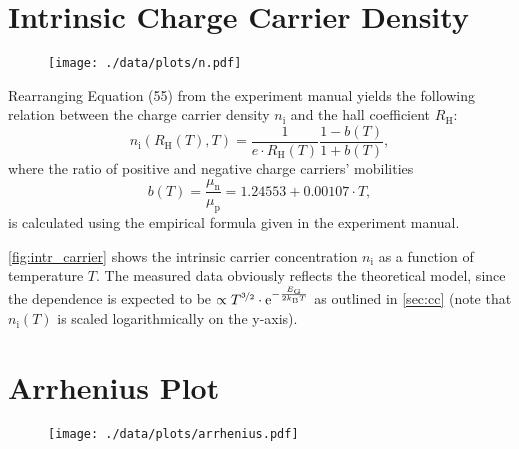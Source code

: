 \section{Intrinsic Charge Carrier Density}
\begin{figure}
	\centering
	\texttt{[image: ./data/plots/n.pdf]}
	\label{fig:intr_carrier}
\end{figure}

Rearranging Equation (55) from the experiment manual yields the following relation between the charge carrier density $n_\text{i}$ and the hall coefficient $R_\text{H}$:
\begin{equation*}
	n_\text{i} \left(R_\text{H}\left( T \right), T \right) = \frac{1}{e \cdot R_\text{H}\left(T\right)} \frac{ 1 - b \left( T \right) }{ 1 + b \left( T \right) },
\end{equation*}
where the ratio of positive and negative charge carriers' mobilities
\begin{equation*}
	b \left( T \right) = \frac{\mu_\text{n}}{\mu_\text{p}} = \num{1.24553} + \num{0.00107} \cdot T,
\end{equation*}
is calculated using the empirical formula given in the experiment manual.

\autoref{fig:intr_carrier} shows the intrinsic carrier concentration $n_\text{i}$ as a function of temperature $T$.
The measured data obviously reflects the theoretical model, since the dependence is expected to be $\propto T^{\nicefrac{3}{2}}\cdot\mathrm{e}^{-\frac{E_\text{G}}{2k_\text{B}T}}$ as outlined in \autoref{sec:cc} (note that $n_\text{i}(T)$ is scaled logarithmically on the y-axis).


\section{Arrhenius Plot}\label{sec:arrhenius}
\begin{figure}
	\centering
	\texttt{[image: ./data/plots/arrhenius.pdf]}
	\label{fig:arrhenius}
\end{figure}

